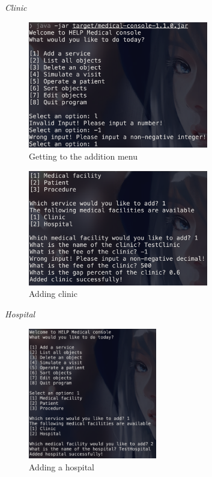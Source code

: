 \documentclass{article}
\begin{document}
	\textit{Clinic}
	\begin{figure}
		\begin{center}
			\includegraphics[width=0.7\textwidth]{figures/Adding/Clinic/Clinic_01.png}
		\end{center}
		\caption{Getting to the addition menu}\label{fig:clinic_01}
	\end{figure}

	\begin{figure}
		\begin{center}
			\includegraphics[width=0.7\textwidth]{figures/Adding/Clinic/Clinic_02.png}
		\end{center}
		\caption{Adding clinic}\label{fig:clinic_02}
	\end{figure}

	\textit{Hospital}
	\begin{figure}
		\begin{center}
			\includegraphics[width=0.5\textwidth]{figures/Adding/Hospital/Hospital_01.png}
		\end{center}
		\caption{Adding a hospital}\label{fig:hospital_01}
	\end{figure}
\end{document}
